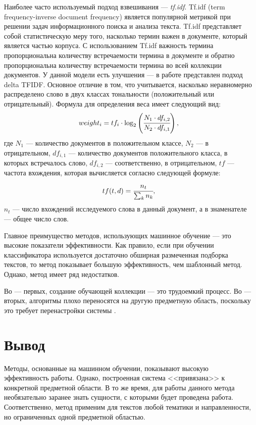 Наиболее часто используемый подход взвешивания --- \textit{tf.idf}\cite{tf}. Tf.idf (term frequency-inverse document frequency) является популярной метрикой при решении задач информационного поиска и анализа текста. Tf.idf представляет собой статистическую меру того, насколько термин важен в документе, который является частью корпуса. С использованием Tf.idf важность термина пропорциональна количеству встречаемости термина в документе и обратно пропорциональна количеству встречаемости термина во всей
коллекции документов.
У данной модели есть улучшения --- в работе \cite{delta} представлен подход delta TFIDF. Основное отличие в том, что учитывается, насколько неравномерно распределено слово в двух классах тональности (положительный или отрицательный). Формула для определения веса имеет следующий вид: 
\begin{equation}
	weight_i = tf_i \cdot \log_2\left(\cfrac{N_1 \cdot df_{i, 2}}{N_2 \cdot df_{i, 1}}\right),
\end{equation} 
где $N_1$ --- количество документов в положительном классе, $N_2$ --- в отрицательном, $df_{i, 1}$ --- количество документов положительного класса, в которых встречалось слово, $df_{i, 2}$ --- соответственно, в отрицательном, $tf$ --- частота вхождения, которая вычисляется согласно следующей формуле:
\begin{equation}
	tf(t, d) = \cfrac{n_t}{\sum_{k}n_k},
\end{equation}
$n_t$ --- число вхождений исследуемого слова в данный документ, а в знаменателе --- общее число слов.

Главное преимущество методов, использующих машинное обучение --- это высокие показатели эффективности. Как правило, если при обучении классификатора используется достаточно обширная размеченная подборка текстов, то метод показывает большую эффективность, чем шаблонный метод. Однако, метод имеет ряд недостатков. 

Во --- первых, создание обучающей коллекции --- это трудоемкий процесс. Во --- вторых, алгоритмы плохо переносятся на другую предметную область, поскольку это требует перенастройки системы \cite{rework}. 
\section{Вывод}
Методы, основанные на машинном обучении, показывают высокую эффективность работы. Однако, построенная система <<привязана>> к конкретной предметной области. В то же время, для работы данного метода необязательно заранее знать сущности, с которыми будет проведена работа. Соответственно, метод применим для текстов любой тематики и направленности, но ограниченных одной предметной областью.